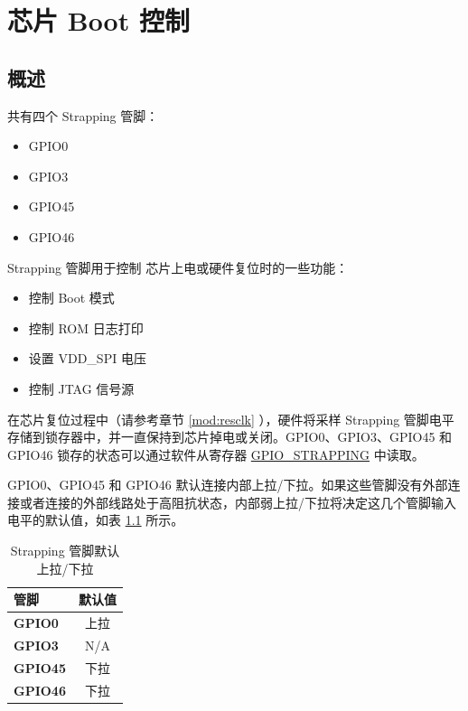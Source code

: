 \documentclass[main\_\_CN.tex]{subfiles}
\begin{document}

\ifglobal
\else
    {\let\clearpage\relax \listoftodos}
    \tableofcontents
\fi


\hypertarget{bootctrl}{}
\chapter{芯片 Boot 控制}
\label{mod:bootctrl}

\section{概述}

\chipname{} 共有四个 Strapping 管脚：
\begin{itemize}
    \item GPIO0
    \item GPIO3
    \item GPIO45
    \item GPIO46
\end{itemize}
Strapping 管脚用于控制 \chipname{} 芯片上电或硬件复位时的一些功能：
\begin{itemize}
    \item 控制 Boot 模式
    \item 控制 ROM 日志打印
    \item 设置 VDD\_SPI 电压
    \item 控制 JTAG 信号源
\end{itemize}

在芯片复位过程中（请参考章节 \ref{mod:resclk} \textit{}），硬件将采样 Strapping 管脚电平存储到锁存器中，并一直保持到芯片掉电或关闭。GPIO0、GPIO3、GPIO45 和 GPIO46 锁存的状态可以通过软件从寄存器 \hyperref[fielddesc:GPIOSTRAPPING]{GPIO\_STRAPPING} 中读取。

GPIO0、GPIO45 和 GPIO46 默认连接内部上拉/下拉。如果这些管脚没有外部连接或者连接的外部线路处于高阻抗状态，内部弱上拉/下拉将决定这几个管脚输入电平的默认值，如表 \ref{tab:bootctrl-default-config-strapping-pins} 所示。

\begin{longtable}[c]{|l|c|}
\caption{Strapping 管脚默认上拉/下拉}
\label{tab:bootctrl-default-config-strapping-pins} \\
    \hline
    \rowcolor{lightgray}
  \textbf{管脚} & \textbf{默认值} \\ \hline
  \textbf{GPIO0} & 上拉 \\ \hline
  \textbf{GPIO3} & N/A \\ \hline
  \textbf{GPIO45} & 下拉 \\ \hline
  \textbf{GPIO46} & 下拉 \\ \hline
\end{longtable}
\end{document}
